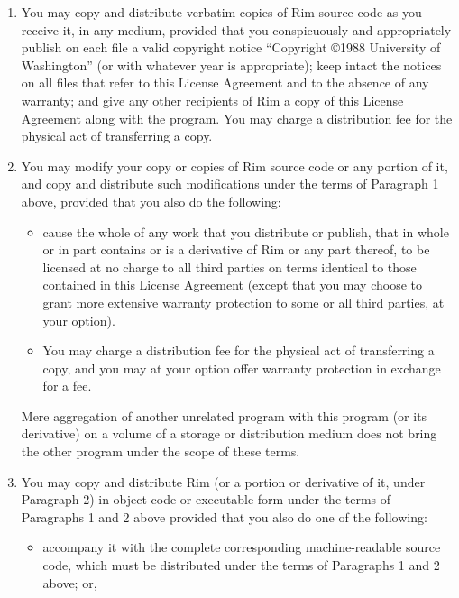 \documentclass[11pt,a4paper]{report}
\begin{document}
\begin{enumerate}
\item
You may copy and distribute verbatim copies of Rim source code as you
receive it, in any medium, provided that you conspicuously and
appropriately publish on each file a valid copyright notice ``Copyright
\copyright 1988 University of Washington'' (or with whatever year
is appropriate); keep intact the notices on all files that
refer to this License Agreement and to the absence of any warranty; and
give any other recipients of Rim a copy of this License
Agreement along with the program.  You may charge a distribution fee
for the physical act of transferring a copy.
 
\item
You may modify your copy or copies of Rim source code or
any portion of it, and copy and distribute such modifications under
the terms of Paragraph 1 above, provided that you also do the following:
 
\begin{itemize}
\item
cause the whole of any work that you distribute or publish, that
in whole or in part contains or is a derivative of Rim or any
part thereof, to be licensed at no charge to all third parties on
terms identical to those contained in this License Agreement
(except that you may choose to grant more extensive warranty
protection to some or all third parties, at your option).
 
\item
You may charge a distribution fee for the physical act of
transferring a copy, and you may at your option offer warranty
protection in exchange for a fee.
\end{itemize}
 
Mere aggregation of another unrelated program with this program (or its
derivative) on a volume of a storage or distribution medium does not bring
the other program under the scope of these terms.
 
\item
You may copy and distribute Rim (or a portion or derivative of it,
under Paragraph 2) in object code or executable form under the terms
of Paragraphs 1 and 2 above provided that you also do one of the
following:
 
\begin{itemize}
\item
accompany it with the complete corresponding machine-readable
source code, which must be distributed under the terms of
Paragraphs 1 and 2 above; or,
 

\end{itemize}
\end{enumerate}
\end{document}
